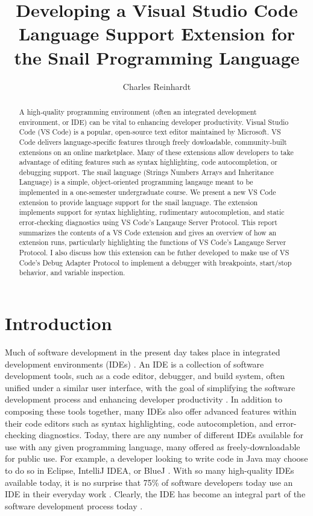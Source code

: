 \documentclass{article}
\title{Developing a Visual Studio Code Language Support Extension for the Snail Programming Language}
\author{Charles Reinhardt}
\begin{document}
\maketitle

\begin{abstract}

    A high-quality programming environment (often an integrated development environment, or IDE) can be vital to enhancing developer productivity. Visual Studio Code (VS Code) is a popular, open-source text editor maintained by Microsoft. VS Code delivers language-specific features through freely dowloadable, community-built extensions on an online marketplace. Many of these extensions allow developers to take advantage of editing features such as syntax highlighting, code autocompletion, or debugging support. The snail language (Strings Numbers Arrays and Inheritance Language) is a simple, object-oriented programming langauge meant to be implemented in a one-semester undergraduate course. We present a new VS Code extension to provide language support for the snail language. The extension implements support for syntax highlighting, rudimentary autocompletion, and static error-checking diagnostics using VS Code's Langauge Server Protocol. This report summarizes the contents of a VS Code extension and gives an overview of how an extension runs, particularly highlighting the functions of VS Code's Langauge Server Protocol. I also discuss how this extension can be futher developed to make use of VS Code's Debug Adapter Protocol to implement a debugger with breakpoints, start/stop behavior, and variable inspection.

\end{abstract}

\section{Introduction}

Much of software development in the present day takes place in integrated development environments (IDEs) \cite{JetBrains_2019}. An IDE is a collection of software development tools, such as a code editor, debugger, and build system, often unified under a similar user interface, with the goal of simplifying the software development process and enhancing developer productivity \cite{Gillis_Silverthorne_2018,Shyniaieva_2023}. In addition to composing these tools together, many IDEs also offer advanced features within their code editors such as syntax highlighting, code autocompletion, and error-checking diagnostics. Today, there are any number of different IDEs available for use with any given programming language, many offered as freely-downloadable for public use. For example, a developer looking to write code in Java may choose to do so in Eclipse, IntelliJ IDEA, or BlueJ \cite{EclipseFoundation_2023, JetBrains_2023,KingsProgrammingEducationToolsGroup_2022}. With so many high-quality IDEs available today, it is no surprise that 75\% of software developers today use an IDE in their everyday work \cite{JetBrains_2019}. Clearly, the IDE has become an integral part of the software development process today \cite{Vaniukov_2023}. 
\end{document}
